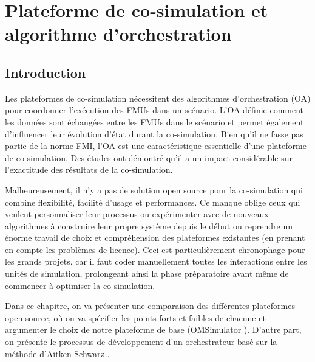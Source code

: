 \chapter{Plateforme de co-simulation et algorithme d'orchestration}\label{sec:orc}
\section*{Introduction}
Les plateformes de co-simulation nécessitent des algorithmes d'orchestration (OA) pour coordonner l'exécution des FMUs dans un scénario. L'OA définie comment les données sont échangées entre les FMUs dans le scénario et permet également d'influencer leur évolution d'état durant la co-simulation. Bien qu'il ne fasse pas partie de la norme FMI, l'OA est une caractéristique essentielle d'une plateforme de co-simulation. Des études ont démontré qu'il a un impact considérable sur l'exactitude des résultats de la co-simulation\cite{b7}.


Malheureusement, il n'y a pas de solution open source pour la co-simulation qui combine flexibilité, facilité d'usage et performances. Ce manque oblige ceux qui veulent personnaliser leur processus ou expérimenter avec de nouveaux algorithmes à construire leur propre système depuis le début ou reprendre un énorme travail de choix et compréhension des plateformes existantes (en prenant en compte les problèmes de licence). Ceci est particulièrement chronophage pour les grands projets, car il faut coder manuellement toutes les interactions entre les unités de simulation, prolongeant ainsi la phase préparatoire avant même de commencer à optimiser la co-simulation.

Dans ce chapitre, on va présenter une comparaison des différentes plateformes open source, où on va spécifier les points forts et faibles de chacune et argumenter le choix de notre plateforme de base (OMSimulator \cite{b14}). D'autre part, on présente le processus de développement d'un orchestrateur basé sur la méthode d'Aitken-Schwarz \cite{b27,b28}.

